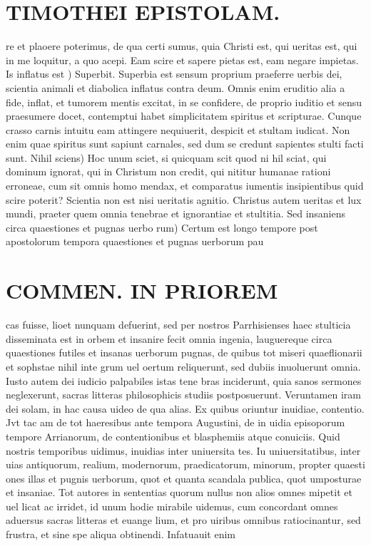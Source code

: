 \documentclass{article}
\begin{document}
\begin{pages}
\section*{TIMOTHEI EPISTOLAM. }
\marginpar{[ p.157 ]}\pstart re et plaoere poterimus, de qua certi sumus, quia Christi est, qui ueritas est, qui in me loquitur, a quo acepi. Eam scire et sapere pietas est, eam negare impietas.  \pend\pstart Is inflatus est ) Superbit. Superbia est sensum proprium praeferre uerbis dei, scientia animali et diabolica inflatus contra deum. Omnis enim eruditio alia a fide, inflat, et tumorem mentis excitat, in se confidere, de proprio iuditio et sensu praesumere docet, contemptui habet simplicitatem spiritus et scripturae. Cunque crasso carnis intuitu eam attingere nequiuerit, despicit et stultam iudicat. Non enim quae spiritus sunt sapiunt carnales, sed dum se credunt sapientes stulti facti sunt.  \pend\pstart Nihil sciens) Hoc unum sciet, si quicquam scit quod ni hil sciat, qui dominum ignorat, qui in Christum non credit, qui nititur humanae rationi erroneae, cum sit omnis homo mendax, et comparatus iumentis insipientibus quid scire poterit? Scientia non est nisi ueritatis agnitio. Christus autem ueritas et lux mundi, praeter quem omnia tenebrae et ignorantiae et stultitia.  \pend\pstart Sed insaniens circa quaestiones et pugnas uerbo rum) Certum est longo tempore post apostolorum tempora quaestiones et pugnas uerborum pau\pend
\section*{COMMEN. IN PRIOREM }
\marginpar{[ p.158 ]}\pstart cas fuisse, lioet nunquam defuerint, sed per nostros Parrhisienses haec stulticia disseminata est in orbem et insanire fecit omnia ingenia, lauguereque circa quaestiones futiles et insanas uerborum pugnas, de quibus tot miseri quaeflionarii et sophstae nihil inte grum uel oertum reliquerunt, sed dubiis inuoluerunt omnia. Iusto autem dei iudicio palpabiles istas tene bras inciderunt, quia sanos sermones neglexerunt, sacras litteras philosophicis studiis postposuerunt. Veruntamen iram dei solam, in hac causa uideo de qua alias.  \pend\pstart Ex quibus oriuntur inuidiae, contentio. Jvt tac am de tot haeresibus ante tempora Augustini, de in uidia episoporum tempore Arrianorum, de contentionibus et blasphemiis atque conuiciis. Quid nostris temporibus uidimus, inuidias inter uniuersita tes. Iu uniuersitatibus, inter uias antiquorum, realium, modernorum, praedicatorum, minorum, propter quaesti ones illas et pugnis uerborum, quot et quanta scandala publica, quot umposturae et insaniae. Tot autores in sententias quorum nullus non alios omnes mipetit et uel licat ac irridet, id unum hodie mirabile uidemus, cum concordant omnes aduersus sacras litteras et euange lium, et pro uiribus omnibus ratiocinantur, sed frustra, et sine spe aliqua obtinendi. Infatuauit enim  \pend

\end{pages}
\end{document}
